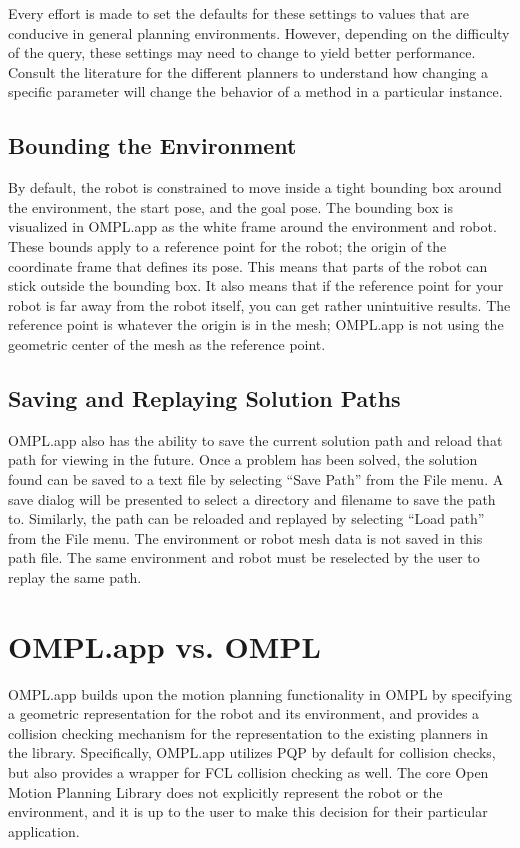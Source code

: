 Every effort is made to set the defaults for these settings to values that are 
conducive in general planning environments.  However, depending on the
difficulty of the query, these settings may need to change to yield better 
performance.  Consult the literature for the different planners to understand 
how changing a specific parameter will change the behavior of a method in a
particular instance.

\subsection {Bounding the Environment}
By default, the robot is constrained to move inside a tight bounding box around
the environment, the start pose, and the goal pose. The bounding box is 
visualized in OMPL.app as the white frame around the environment and robot.  
These bounds apply to a reference point for the robot; the origin of the 
coordinate frame that defines its pose. This means that parts of the robot can
stick outside the bounding box. It also means that if the reference point for 
your robot is far away from the robot itself, you can get rather unintuitive 
results. The reference point is whatever the origin is in the mesh; OMPL.app is
not using the geometric center of the mesh as the reference point.

\subsection {Saving and Replaying Solution Paths}
OMPL.app also has the ability to save the current solution path and reload that
path for viewing in the future.  Once a problem has been solved, the solution
found can be saved to a text file by selecting ``Save Path'' from the File menu.
A save dialog will be presented to select a directory and filename to save the 
path to. Similarly, the path can be reloaded and replayed by selecting ``Load
path'' from the File menu.  The environment or robot mesh data is not saved in
this path file.  The same environment and robot must be reselected by the user
to replay the same path.

\section {OMPL.app vs. OMPL}
OMPL.app builds upon the motion planning functionality in OMPL by specifying
a geometric representation for the robot and its environment, and provides 
a collision checking mechanism for the representation to the existing planners
in the library.  Specifically, OMPL.app utilizes PQP \cite{Larsen:2000} by 
default for collision checks, but also provides a wrapper for FCL 
\cite{Jia:2011} collision checking as well. The core Open Motion Planning 
Library does not explicitly represent the robot or the environment, and it is 
up to the user to make this decision for their particular application.


